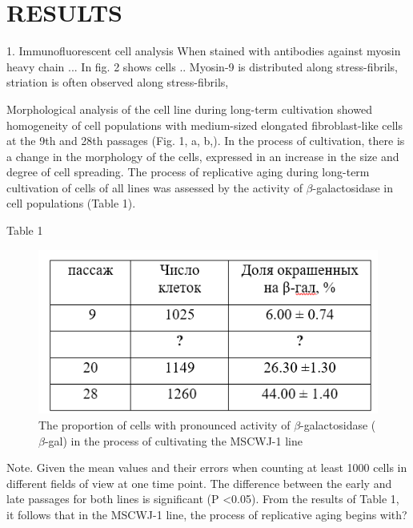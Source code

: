 \documentclass[a4paper,12pt]{article}
\begin{document}
\section{RESULTS}

1. Immunofluorescent cell analysis
When stained with antibodies against myosin heavy chain ...
In fig. 2 shows cells ..
Myosin-9 is distributed along stress-fibrils, striation is often observed along stress-fibrils,

Morphological analysis of the cell line during long-term cultivation showed homogeneity of cell populations with medium-sized elongated fibroblast-like cells at the 9th and 28th passages (Fig. 1, a, b,). In the process of cultivation, there is a change in the morphology of the cells, expressed in an increase in the size and degree of cell spreading.
The process of replicative aging during long-term cultivation of cells of all lines was assessed by the activity of $\beta$-galactosidase in cell populations (Table 1).


Table 1

\begin{figure}[hbt!]
\centering
\includegraphics[width=0.5\linewidth]{tab.png}
\caption{The proportion of cells with pronounced activity of $\beta$-galactosidase ($\beta$-gal)
 in the process of cultivating the MSCWJ-1 line}
\label{fig:tab}
\end{figure}

Note. Given the mean values and their errors when counting at least 1000 cells in different fields of view at one time point. The difference between the early and late passages for both lines is significant (P <0.05).
  From the results of Table 1, it follows that in the MSCWJ-1 line, the process of replicative aging begins with?
\end{document}

